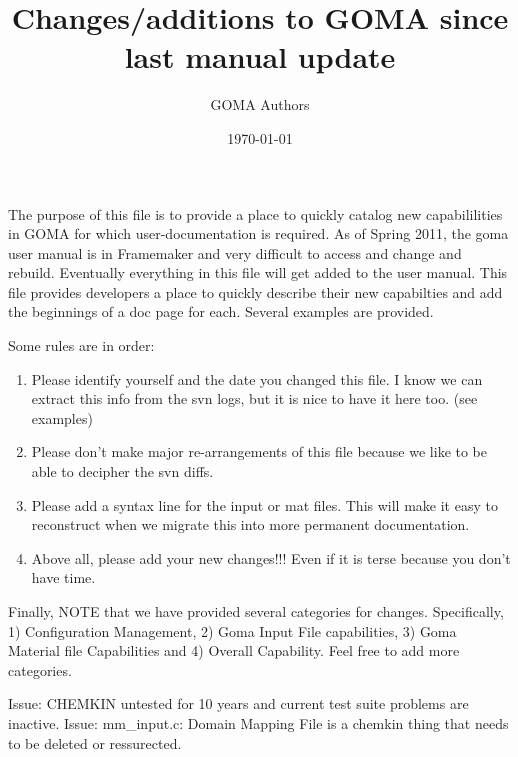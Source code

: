 \documentclass{article}
\title{Changes/additions to GOMA since last manual update}
\author{GOMA Authors}
\date{\today}
\begin{document}
\maketitle



The purpose of this file is to provide a place to quickly catalog new capabililities in GOMA for which user-documentation is required.  As of Spring 2011, the goma user manual is in Framemaker and very difficult to access and change and rebuild.    Eventually everything in this file will get added to the user manual.  This file provides developers a place to quickly describe their new capabilties and add the beginnings of a doc page for each.   Several examples are provided. 

Some rules are in order:
\begin{enumerate}
  \item Please identify yourself and the date you changed this file. I know we can extract this info from the svn logs, but it is nice to have it here too. (see examples)
  \item Please don't make major re-arrangements of this file because we like to be able to decipher the svn diffs. 
  \item Please add a syntax line for the input or mat files.   This will make it easy to reconstruct when we migrate this into more permanent documentation. 
  \item Above all, please add your new changes!!! Even if it is terse because you don't have time.   
\end{enumerate}

Finally, NOTE that we have provided several categories for changes.   Specifically, 1) Configuration Management, 2) Goma Input File capabilities, 3) Goma Material file Capabilities and 4) Overall Capability.    Feel free to add more categories.  


Issue:  CHEMKIN untested for 10 years and current test suite problems are inactive.   
Issue:  mm_input.c: Domain Mapping File is a chemkin thing that needs to be deleted or ressurected.   
\end{document}
